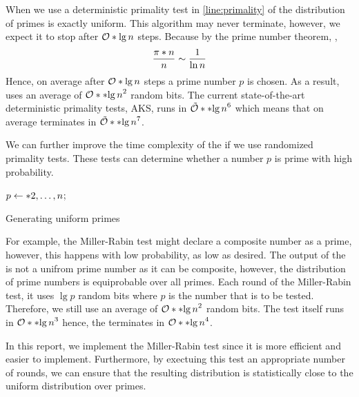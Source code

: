 When we use a deterministic primality test in \cref{line:primality} of  the distribution of primes is exactly uniform. This algorithm may never terminate, however, we expect it to stop after \(\bigO{\lg n}\) steps. Because by the prime number theorem, , 
\begin{equation}
    \dfrac{\func{\pi}{n}}{n} \sim \dfrac{1}{\ln n}
\end{equation}
Hence, on average after \(\bigO{\lg n}\) steps a prime number \(p\) is chosen. As a result,  uses an average of \(\bigO{\bracket{\lg n}^2}\) random bits. The current state-of-the-art deterministic primality tests, AKS, runs in \(\logBigO{\bracket{\lg n}^6}\) \cite{lenstra} which means that on average  terminates in \(\logBigO{\bracket{\lg n}^7}\). 

We can further improve the time complexity of the  if we use randomized primality tests. These tests can determine whether a number \(p\) is prime with high probability. 
\begin{algorithm}
	\DontPrintSemicolon
    {
        \(p \gets \set{2,\dots, n}\);
    }
	\caption{Generating uniform primes}
    \label{alg:trivialRPNG}
\end{algorithm}

For example, the Miller-Rabin test might declare a composite number as a prime, however, this happens with low probability, as low as desired. The output of the  is not a unifrom prime number as it can be composite, however, the distribution of prime numbers is equiprobable over all primes. Each round of the Miller-Rabin test, it uses \(\lg p\) random bits where \(p\) is the number that is to be tested. Therefore, we still use an average of \(\bigO{\bracket{\lg n}^2}\) random bits. The test itself runs in \(\bigO{\bracket{\lg n}^3}\) \cite{bach} hence, the  terminates in \(\bigO{\bracket{\lg n}^4}\).

In this report, we implement the Miller-Rabin test since it is more efficient and easier to implement. Furthermore, by exectuing this test an appropriate number of rounds, we can ensure that the resulting distribution is statistically close to the uniform distribution over primes.

